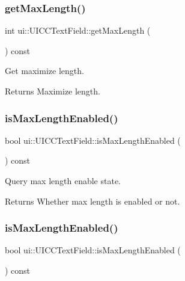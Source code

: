 \subsubsection{\texorpdfstring{get\+Max\+Length()}{getMaxLength()}\hspace{0.1cm}{\footnotesize\ttfamily [2/2]}}
{\footnotesize\ttfamily int ui\+::\+U\+I\+C\+C\+Text\+Field\+::get\+Max\+Length (\begin{DoxyParamCaption}{ }\end{DoxyParamCaption}) const}

Get maximize length. \begin{DoxyReturn}{Returns}
Maximize length. 
\end{DoxyReturn}
\mbox{\label{classui_1_1UICCTextField_a80855457b243d58c55f19f9ca3933758}} 
\subsubsection{\texorpdfstring{is\+Max\+Length\+Enabled()}{isMaxLengthEnabled()}\hspace{0.1cm}{\footnotesize\ttfamily [1/2]}}
{\footnotesize\ttfamily bool ui\+::\+U\+I\+C\+C\+Text\+Field\+::is\+Max\+Length\+Enabled (\begin{DoxyParamCaption}{ }\end{DoxyParamCaption}) const}

Query max length enable state. \begin{DoxyReturn}{Returns}
Whether max length is enabled or not. 
\end{DoxyReturn}
\mbox{\label{classui_1_1UICCTextField_a80855457b243d58c55f19f9ca3933758}} 
\subsubsection{\texorpdfstring{is\+Max\+Length\+Enabled()}{isMaxLengthEnabled()}\hspace{0.1cm}{\footnotesize\ttfamily [2/2]}}
{\footnotesize\ttfamily bool ui\+::\+U\+I\+C\+C\+Text\+Field\+::is\+Max\+Length\+Enabled (\begin{DoxyParamCaption}{ }\end{DoxyParamCaption}) const}

